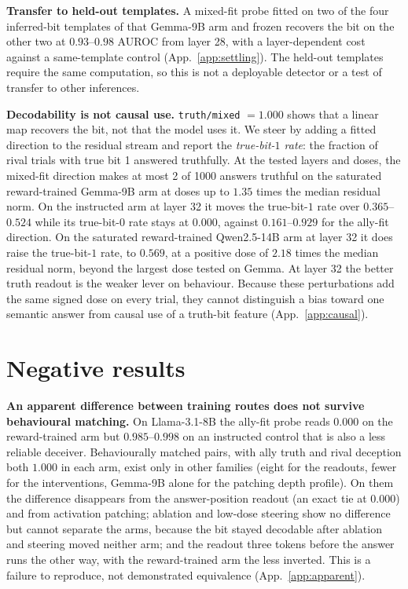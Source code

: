 \documentclass{article}
\newcommand{\tm}{\texttt{truth/mixed}}
\begin{document}
\textbf{Transfer to held-out templates.} A mixed-fit probe fitted on two of the four inferred-bit templates of that Gemma-9B arm and frozen recovers the bit on the other two at $0.93$--$0.98$ AUROC from layer 28, with a layer-dependent cost against a same-template control (App.~\ref{app:settling}). The held-out templates require the same computation, so this is not a deployable detector or a test of transfer to other inferences.

\textbf{Decodability is not causal use.} \tm{} $= 1.000$ shows that a linear map recovers the bit, not that the model uses it. We steer by adding a fitted direction to the residual stream and report the \emph{true-bit-$1$ rate}: the fraction of rival trials with true bit 1 answered truthfully. At the tested layers and doses, the mixed-fit direction makes at most 2 of 1000 answers truthful on the saturated reward-trained Gemma-9B arm at doses up to $1.35$ times the median residual norm. On the instructed arm at layer 32 it moves the true-bit-$1$ rate over $0.365$--$0.524$ while its true-bit-$0$ rate stays at $0.000$, against $0.161$--$0.929$ for the ally-fit direction. On the saturated reward-trained Qwen2.5-14B arm at layer 32 it does raise the true-bit-$1$ rate, to $0.569$, at a positive dose of $2.18$ times the median residual norm, beyond the largest dose tested on Gemma. At layer 32 the better truth readout is the weaker lever on behaviour. Because these perturbations add the same signed dose on every trial, they cannot distinguish a bias toward one semantic answer from causal use of a truth-bit feature (App.~\ref{app:causal}).

\section{Negative results}
\label{sec:negatives}

\textbf{An apparent difference between training routes does not survive behavioural matching.} On Llama-3.1-8B the ally-fit probe reads $0.000$ on the reward-trained arm but $0.985$--$0.998$ on an instructed control that is also a less reliable deceiver. Behaviourally matched pairs, with ally truth and rival deception both $1.000$ in each arm, exist only in other families (eight for the readouts, fewer for the interventions, Gemma-9B alone for the patching depth profile). On them the difference disappears from the answer-position readout (an exact tie at $0.000$) and from activation patching; ablation and low-dose steering show no difference but cannot separate the arms, because the bit stayed decodable after ablation and steering moved neither arm; and the readout three tokens before the answer runs the other way, with the reward-trained arm the less inverted. This is a failure to reproduce, not demonstrated equivalence (App.~\ref{app:apparent}).
\end{document}
